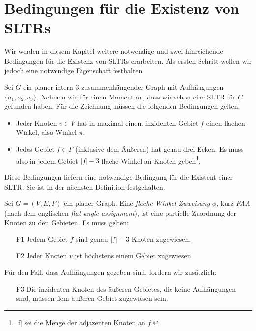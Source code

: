\chapter{Bedingungen für die Existenz von SLTRs}\label{main_theory}

Wir werden in diesem Kapitel weitere notwendige und zwei hinreichende Bedingungen für die Existenz von SLTRs erarbeiten. Als ersten Schritt wollen wir jedoch eine notwendige Eigenschaft festhalten.

Sei $G$ ein planer intern 3-zusammenhängender Graph mit Aufhängungen $\{a_1,a_2,a_3\}$. Nehmen wir für einen Moment an, dass wir schon eine SLTR für $G$ gefunden haben. Für die Zeichnung müssen die folgenden Bedingungen gelten:

\begin{itemize}
\item Jeder Knoten $v \in V$ hat in maximal einem inzidenten Gebiet $f$ einen flachen Winkel, also Winkel $\pi$.
\item Jedes Gebiet $f \in F$ (inklusive dem Äußeren) hat genau drei Ecken. Es muss also in jedem Gebiet $|f|-3$ flache Winkel an Knoten geben\footnote{|f| sei die Menge der adjazenten Knoten an $f$.}.
\end{itemize}

Diese Bedingungen liefern eine notwendige Bedingung für die Existent einer SLTR. Sie ist in der nächsten Definition festgehalten.

\begin{definition}[FAA]\label{def_faa}
Sei $G=(V,E,F)$ ein planer Graph. Eine \textit{flache Winkel Zuweisung} $\phi$, kurz \textit{FAA} (nach dem englischen \textit{flat angle assignment}), ist eine partielle Zuordnung der Knoten zu den Gebieten. Es muss gelten:
\begin{itemize}
\item [F1] Jedem Gebiet $f$ sind genau $|f|-3$ Knoten zugewiesen.
\item [F2] Jeder Knoten $v$ ist höchstens einem Gebiet zugewiesen.
\end{itemize}
Für den Fall, dass Aufhängungen gegeben sind, fordern wir zusätzlich:
\begin{itemize}
\item [F3] Die inzidenten Knoten des äußeren Gebietes, die keine Aufhängungen sind, müssen dem äußeren Gebiet zugewiesen sein.
\end{itemize}

\end{definition}

